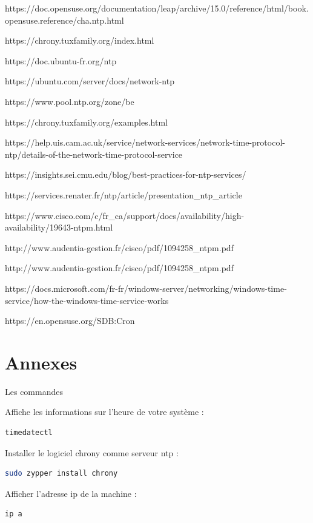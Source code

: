 \documentclass[a4paper]{article}
\begin{document}
\begin{adjustwidth}{-2cm}{-2cm}
\begin{thebibliography}{99}
  https://doc.opensuse.org/documentation/leap/archive/15.0/reference/html/book.opensuse.reference/cha.ntp.html

 https://chrony.tuxfamily.org/index.html

 https://doc.ubuntu-fr.org/ntp

 https://ubuntu.com/server/docs/network-ntp

 https://www.pool.ntp.org/zone/be

 https://chrony.tuxfamily.org/examples.html

 https://help.uis.cam.ac.uk/service/network-services/network-time-protocol-ntp/details-of-the-network-time-protocol-service

 https://insights.sei.cmu.edu/blog/best-practices-for-ntp-services/

 https://services.renater.fr/ntp/article/presentation\_ntp\_article

 https://www.cisco.com/c/fr\_ca/support/docs/availability/high-availability/19643-ntpm.html

 http://www.audentia-gestion.fr/cisco/pdf/1094258\_ntpm.pdf

 http://www.audentia-gestion.fr/cisco/pdf/1094258\_ntpm.pdf

 https://docs.microsoft.com/fr-fr/windows-server/networking/windows-time-service/how-the-windows-time-service-works

 https://en.opensuse.org/SDB:Cron

\end{thebibliography}

 \newpage
\section{Annexes}
Les commandes \newline

\noindent Affiche les informations sur l’heure de votre système :
\begin{lstlisting}[language=bash]
  timedatectl
\end{lstlisting}

\noindent Installer le logiciel chrony comme serveur ntp :
\begin{lstlisting}[language=bash]
  sudo zypper install chrony
\end{lstlisting}

\noindent Afficher l'adresse ip de la machine :
\begin{lstlisting}[language=bash]
  ip a
\end{lstlisting}


\end{adjustwidth}
\end{document}
